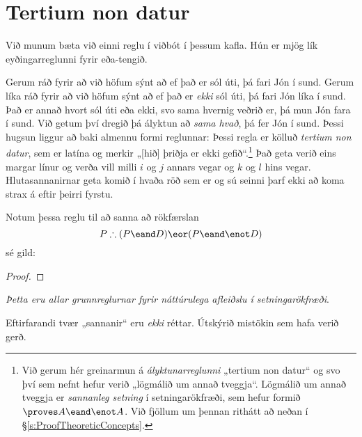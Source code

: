 \section{Tertium non datur}

Við munum bæta við einni reglu í viðbót í þessum kafla. Hún er mjög lík eyðingarreglunni fyrir eða-tengið. 

Gerum ráð fyrir að við höfum sýnt að ef það er sól úti, þá fari Jón í sund. Gerum líka ráð fyrir að við höfum sýnt að ef það er \emph{ekki} sól úti, þá fari Jón líka í sund. Það er annað hvort sól úti eða ekki, svo sama hvernig veðrið er, þá mun Jón fara í sund. Við getum því dregið þá ályktun að \emph{sama hvað}, þá fer Jón í sund. Þessi hugsun liggur að baki almennu formi reglunnar:
Þessi regla er kölluð \emph{tertium non datur}, sem er latína og merkir „[hið] þriðja er ekki gefið“.\footnote{Við gerum hér greinarmun á \emph{ályktunarreglunni} „tertium non datur“ og svo því sem nefnt hefur verið „lögmálið um annað tveggja“. Lögmálið um annað tveggja er \emph{sannanleg setning} í setningarökfræði, sem hefur formið $\proves A \eand \enot A$. Við fjöllum um þennan rithátt að neðan í \S\ref{s:ProofTheoreticConcepts}.} Það geta verið eins margar línur og verða vill milli $i$ og $j$ annars vegar og $k$ og $l$ hins vegar. Hlutasannanirnar geta komið í hvaða röð sem er og sú seinni þarf ekki að koma strax á eftir þeirri fyrstu. 

Notum þessa reglu til að sanna að rökfærslan $$P \therefore (P \eand D) \eor (P \eand \enot D)$$ sé gild:
	\begin{proof}
		\open
		\close
		\open
		\close
	\end{proof}
\emph{Þetta eru allar grunnreglurnar fyrir náttúrulega afleiðslu í setningarökfræði}.	
	
\practiceproblems

\problempart
Eftirfarandi tvær „sannanir“ eru \emph{ekki} réttar. Útskýrið mistökin sem hafa verið gerð.

